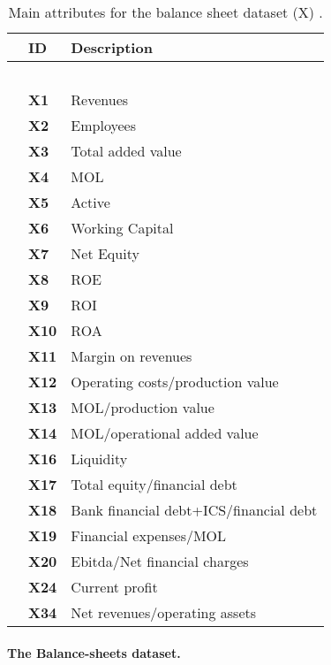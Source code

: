 \begin{table}
\small
\begin{center}
\begin{tabular}{| lll | }
\hline

   &  \textbf{ID}       &\textbf{Description} \\
\hline
\hline
 &  \ & \\
&\textbf{X1}    &Revenues   \\
&\textbf{X2}    &Employees   \\
&\textbf{X3}    &Total added value  \\
&\textbf{X4}    &MOL \\
&\textbf{X5}    &Active  \\
&\textbf{X6}    &Working Capital  \\
&\textbf{X7}    &Net Equity \\
&\textbf{X8}    &ROE  \\
&\textbf{X9}    &ROI \\
&\textbf{X10}    &ROA   \\
&\textbf{X11}    & Margin on revenues \\
&\textbf{X12}    &Operating costs/production value  \\
&\textbf{X13}    &MOL/production value\\
&\textbf{X14}    &MOL/operational added value\\
&\textbf{X16}    &Liquidity\\
&\textbf{X17}    &Total equity/financial debt\\
&\textbf{X18}    &Bank financial debt+ICS/financial debt\\
&\textbf{X19}    &Financial expenses/MOL\\
&\textbf{X20}    &Ebitda/Net financial charges\\
&\textbf{X24}    &Current profit\\
&\textbf{X34}    &Net revenues/operating assets\\

\hline

\end{tabular}
\caption{Main attributes for the balance sheet dataset (X)
.}
\label{tbl:attributes}
\end{center}
\end{table}




\paragraph{The Balance-sheets dataset.}

